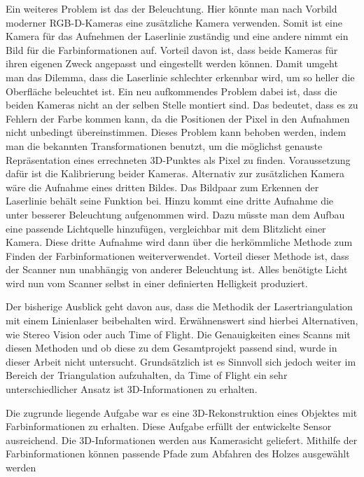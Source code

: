 	Ein weiteres Problem ist das der Beleuchtung. Hier könnte man nach Vorbild moderner RGB-D-Kameras eine zusätzliche Kamera verwenden. Somit ist eine Kamera für das Aufnehmen der Laserlinie zuständig und eine andere nimmt ein Bild für die Farbinformationen auf. Vorteil davon ist, dass beide Kameras für ihren eigenen Zweck angepasst und eingestellt werden können. Damit umgeht man das Dilemma, dass die Laserlinie schlechter erkennbar wird, um so heller die Oberfläche beleuchtet ist. Ein neu aufkommendes Problem dabei ist, dass die beiden Kameras nicht an der selben Stelle montiert sind. Das bedeutet, dass es zu Fehlern der Farbe kommen kann, da die Positionen der Pixel in den Aufnahmen nicht unbedingt übereinstimmen. Dieses Problem kann behoben werden, indem man die bekannten Transformationen benutzt, um die möglichst genauste Repräsentation eines errechneten 3D-Punktes als Pixel zu finden. Voraussetzung dafür ist die Kalibrierung beider Kameras. Alternativ zur zusätzlichen Kamera wäre die Aufnahme eines dritten Bildes. Das Bildpaar zum Erkennen der Laserlinie behält seine Funktion bei. Hinzu kommt eine dritte Aufnahme die unter besserer Beleuchtung aufgenommen wird. Dazu müsste man dem Aufbau eine passende Lichtquelle hinzufügen, vergleichbar mit dem Blitzlicht einer Kamera. Diese dritte Aufnahme wird dann über die herkömmliche Methode zum Finden der Farbinformationen weiterverwendet. Vorteil dieser Methode ist, dass der Scanner nun unabhängig von anderer Beleuchtung ist. Alles benötigte Licht wird nun vom Scanner selbst in einer definierten Helligkeit produziert.
	
	Der bisherige Ausblick geht davon aus, dass die Methodik der Lasertriangulation mit einem Linienlaser beibehalten wird. Erwähnenswert sind hierbei Alternativen, wie Stereo Vision oder auch Time of Flight. Die Genauigkeiten eines Scanns mit diesen Methoden und ob diese zu dem Gesamtprojekt passend sind, wurde in dieser Arbeit nicht untersucht. Grundsätzlich ist es Sinnvoll sich jedoch weiter im Bereich der Triangulation aufzuhalten, da Time of Flight ein sehr unterschiedlicher Ansatz ist 3D-Informationen zu erhalten.
	
	Die zugrunde liegende Aufgabe war es eine 3D-Rekonstruktion eines Objektes mit Farbinformationen zu erhalten. Diese Aufgabe erfüllt der entwickelte Sensor ausreichend. Die 3D-Informationen werden aus Kamerasicht geliefert. Mithilfe der Farbinformationen können passende Pfade zum Abfahren des Holzes ausgewählt werden